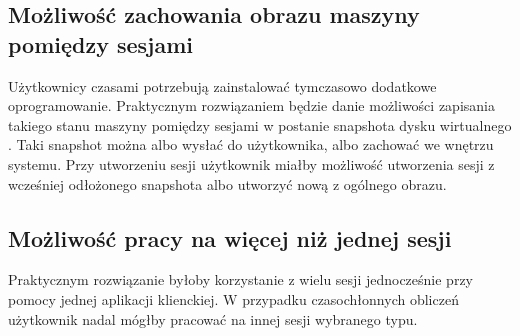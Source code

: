 \documentclass[../podsumowanie.tex]{subfiles}
\begin{document}
\subsection{Możliwość zachowania obrazu maszyny pomiędzy sesjami}
Użytkownicy czasami potrzebują zainstalować tymczasowo dodatkowe oprogramowanie.
Praktycznym rozwiązaniem będzie danie możliwości zapisania takiego stanu maszyny pomiędzy sesjami w postanie snapshota dysku wirtualnego \parencite{libvirt-snapshot}.
Taki snapshot można albo wysłać do użytkownika, albo zachować we wnętrzu systemu.
Przy utworzeniu sesji użytkownik miałby możliwość utworzenia sesji z wcześniej odłożonego snapshota albo utworzyć nową z ogólnego obrazu.

\subsection{Możliwość pracy na więcej niż jednej sesji}
Praktycznym rozwiązanie byłoby korzystanie z wielu sesji jednocześnie przy pomocy jednej aplikacji klienckiej.
W przypadku czasochłonnych obliczeń użytkownik nadal mógłby pracować na innej sesji wybranego typu.
\end{document}
